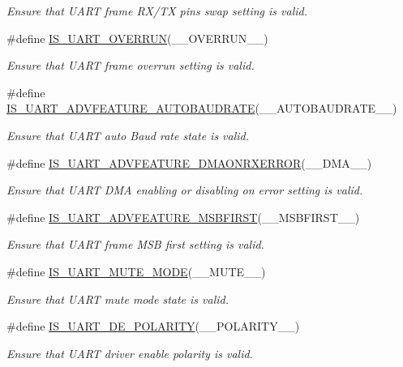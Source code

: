 \begin{DoxyCompactItemize}
\begin{DoxyCompactList}\small\item\em Ensure that U\+A\+RT frame R\+X/\+TX pins swap setting is valid. \end{DoxyCompactList}\item 
\#define \mbox{\hyperlink{group___u_a_r_t___private___macros_ga57b4229ecb4387a0bb9137fed8de13b8}{I\+S\+\_\+\+U\+A\+R\+T\+\_\+\+O\+V\+E\+R\+R\+UN}}(\+\_\+\+\_\+\+O\+V\+E\+R\+R\+U\+N\+\_\+\+\_\+)
\begin{DoxyCompactList}\small\item\em Ensure that U\+A\+RT frame overrun setting is valid. \end{DoxyCompactList}\item 
\#define \mbox{\hyperlink{group___u_a_r_t___private___macros_ga7318c3e5c175b896444697a0a9407b2f}{I\+S\+\_\+\+U\+A\+R\+T\+\_\+\+A\+D\+V\+F\+E\+A\+T\+U\+R\+E\+\_\+\+A\+U\+T\+O\+B\+A\+U\+D\+R\+A\+TE}}(\+\_\+\+\_\+\+A\+U\+T\+O\+B\+A\+U\+D\+R\+A\+T\+E\+\_\+\+\_\+)
\begin{DoxyCompactList}\small\item\em Ensure that U\+A\+RT auto Baud rate state is valid. \end{DoxyCompactList}\item 
\#define \mbox{\hyperlink{group___u_a_r_t___private___macros_ga15b46dfa0d80a4583864a31da73e3c99}{I\+S\+\_\+\+U\+A\+R\+T\+\_\+\+A\+D\+V\+F\+E\+A\+T\+U\+R\+E\+\_\+\+D\+M\+A\+O\+N\+R\+X\+E\+R\+R\+OR}}(\+\_\+\+\_\+\+D\+M\+A\+\_\+\+\_\+)
\begin{DoxyCompactList}\small\item\em Ensure that U\+A\+RT D\+MA enabling or disabling on error setting is valid. \end{DoxyCompactList}\item 
\#define \mbox{\hyperlink{group___u_a_r_t___private___macros_ga82289de330949918b037acf94fb12aef}{I\+S\+\_\+\+U\+A\+R\+T\+\_\+\+A\+D\+V\+F\+E\+A\+T\+U\+R\+E\+\_\+\+M\+S\+B\+F\+I\+R\+ST}}(\+\_\+\+\_\+\+M\+S\+B\+F\+I\+R\+S\+T\+\_\+\+\_\+)
\begin{DoxyCompactList}\small\item\em Ensure that U\+A\+RT frame M\+SB first setting is valid. \end{DoxyCompactList}\item 
\#define \mbox{\hyperlink{group___u_a_r_t___private___macros_ga9df22e11f8bc82847fbe16b6f073ae04}{I\+S\+\_\+\+U\+A\+R\+T\+\_\+\+M\+U\+T\+E\+\_\+\+M\+O\+DE}}(\+\_\+\+\_\+\+M\+U\+T\+E\+\_\+\+\_\+)
\begin{DoxyCompactList}\small\item\em Ensure that U\+A\+RT mute mode state is valid. \end{DoxyCompactList}\item 
\#define \mbox{\hyperlink{group___u_a_r_t___private___macros_gaecf169f01673ae67b12b3155e074bf12}{I\+S\+\_\+\+U\+A\+R\+T\+\_\+\+D\+E\+\_\+\+P\+O\+L\+A\+R\+I\+TY}}(\+\_\+\+\_\+\+P\+O\+L\+A\+R\+I\+T\+Y\+\_\+\+\_\+)
\begin{DoxyCompactList}\small\item\em Ensure that U\+A\+RT driver enable polarity is valid. \end{DoxyCompactList}\end{DoxyCompactItemize}
